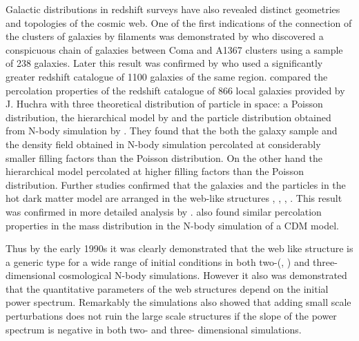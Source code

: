 Galactic distributions in redshift surveys have also revealed distinct geometries and topologies of the cosmic web. One of the first indications of the connection of the clusters of galaxies by filaments was demonstrated by \cite{Gregory1978} who discovered a conspicuous chain of galaxies between Coma and A1367 clusters using a sample of 238 galaxies. Later  this result was confirmed by \cite{Lapparent1986} who used a significantly greater redshift catalogue of 1100 galaxies of the same region. \cite{Zeldovich1982} compared the percolation properties of the redshift catalogue of 866 local galaxies provided by J. Huchra with three theoretical distribution of particle in space: a Poisson distribution, the  hierarchical model by \cite{Soneira1978} and the particle distribution obtained from N-body simulation by \cite{Klypin1983a}.  They found that the both the galaxy sample and the density field obtained in N-body simulation percolated at considerably smaller filling factors  than  the Poisson distribution. On the other hand the  hierarchical model percolated at higher filling factors  than  the Poisson distribution. Further studies confirmed that the galaxies and the particles in the hot dark matter  model are arranged in the web-like structures \cite{Zeldovich1982}, \cite{Shandarin1983}, \cite{Shandarin1983b}, \cite{Shandarin1984}. This result was confirmed in more detailed analysis by \cite{Einasto1984}. \cite{Melott1983b} also found similar percolation properties in the mass distribution in the N-body simulation of a CDM model.
 
Thus by the  early 1990s it was clearly demonstrated that the web like structure is a generic type for a wide range of initial conditions in both two-(\citealt{Melott1990}, \citealt{Beacom1991}) and three- dimensional \citep{Melott1993} cosmological N-body simulations. However it also was demonstrated that the quantitative parameters of the web structures depend on the initial power spectrum. Remarkably the simulations also showed that  adding small scale perturbations does not ruin the large scale structures if the slope of the power spectrum is negative in both two- and three- dimensional simulations.

